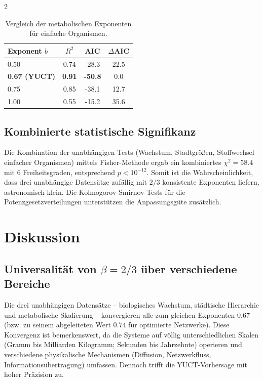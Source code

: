 \documentclass[11pt,a4paper]{article}
\begin{document}
\begin{multicols}{2}
		\begin{table}[htbp]
			\centering
			\caption{Vergleich der metabolischen Exponenten für einfache Organismen.}
			\label{tab:comparison_metab}
			\begin{tabular}{lccc}
				\toprule
				\textbf{Exponent \(b\)} & \(R^2\) & AIC & \(\Delta\)AIC \\
				\midrule
				0.50 & 0.74 & -28.3 & 22.5 \\
				\textbf{0.67 (YUCT)} & \textbf{0.91} & \textbf{-50.8} & 0.0 \\
				0.75 & 0.85 & -38.1 & 12.7 \\
				1.00 & 0.55 & -15.2 & 35.6 \\
				\bottomrule
			\end{tabular}
		\end{table}
		
		\subsection{Kombinierte statistische Signifikanz}
		
		Die Kombination der unabhängigen Tests (Wachstum, Stadtgrößen, Stoffwechsel einfacher Organismen) mittels Fisher-Methode ergab ein kombiniertes \(\chi^2 = 58.4\) mit 6 Freiheitsgraden, entsprechend \(p < 10^{-12}\). Somit ist die Wahrscheinlichkeit, dass drei unabhängige Datensätze zufällig mit \(2/3\) konsistente Exponenten liefern, astronomisch klein. Die Kolmogorov-Smirnov-Tests für die Potenzgesetzverteilungen unterstützen die Anpassungsgüte zusätzlich.
		
		\section{Diskussion}
		
		\subsection{Universalität von \(\beta = 2/3\) über verschiedene Bereiche}
		
		Die drei unabhängigen Datensätze – biologisches Wachstum, städtische Hierarchie und metabolische Skalierung – konvergieren alle zum gleichen Exponenten \(0.67\) (bzw. zu seinem abgeleiteten Wert \(0.74\) für optimierte Netzwerke). Diese Konvergenz ist bemerkenswert, da die Systeme auf völlig unterschiedlichen Skalen (Gramm bis Milliarden Kilogramm; Sekunden bis Jahrzehnte) operieren und verschiedene physikalische Mechanismen (Diffusion, Netzwerkfluss, Informationsübertragung) umfassen. Dennoch trifft die YUCT-Vorhersage mit hoher Präzision zu.
		

\end{multicols}
\end{document}
